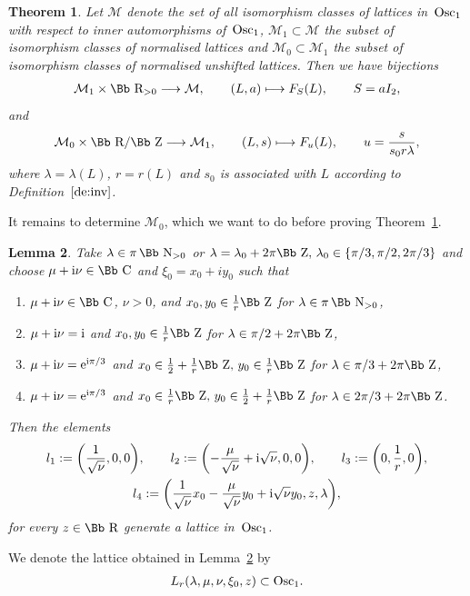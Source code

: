 \documentclass[10pt,a4paper]{amsart}
\newcommand\CC{{\mbox{\Bb C}}}
\newcommand\RR{{\mbox{\Bb R}}}
\newcommand\NN{{\mbox{\Bb N}}}
\newcommand\ZZ{{\mbox{\Bb Z}}}
\newcommand\cM{{\mathcal M}}
\newcommand{\Osc}{{\rm Osc}}
\newcommand{\benur}{\begin{enumerate}[label=$(\roman*)$]\itemsep=0pt}
\numberwithin{equation}{section}
\newtheorem{Theorem}{Theorem}[section]
\newtheorem{Lemma}[Theorem]{Lemma}
\begin{document}
\begin{Theorem} \label{MMM}
Let $\cM$ denote the set of all isomorphism classes of lattices in~$\Osc_1$ with respect to inner automorphisms of~$\Osc_1$, $\cM_1\subset \cM$ the subset of isomorphism classes of normalised lattices and $\cM_0\subset\cM_1$ the subset of isomorphism classes of normalised unshifted lattices. Then we have bijections
\begin{gather*}
\cM_1\times\RR_{>0} \longrightarrow \cM,\qquad (L,a)\longmapsto F_S(L),\qquad S=a I_2,
\end{gather*}
and
\begin{gather}\label{M0M1}
\cM_0 \times \RR/\ZZ \longrightarrow \cM_1,\qquad (L,s) \longmapsto F_u(L),\qquad u=\frac {s}{s_0r\lambda},
\end{gather}
where $\lambda=\lambda(L)$, $r=r(L)$ and $s_0$ is associated with $L$ according to Definition~$\ref{de:inv}$.
\end{Theorem}
It remains to determine $\cM_0$, which we want to do before proving Theorem~\ref{MMM}.
\begin{Lemma}\label{lmlattice} Take $\lambda\in \pi\, \NN_{>0}$ or $\lambda= \lambda_0+2\pi\ZZ,\, \lambda_0\in \{\pi/3, \pi/2, 2\pi/3\}$ and choose $\mu+{\rm i}\nu\in\CC$ and $\xi_0=x_0+iy_0$ such that
\benur
\item $\mu+{\rm i}\nu\in \CC$, $\nu>0$, and $x_0,y_0\in \frac1r \ZZ$ for $\lambda \in \pi\,\NN_{>0}$,
\item $\mu+{\rm i}\nu = {\rm i}$ and $x_0,y_0\in \frac1r \ZZ$ for $\lambda \in \pi/2+2\pi\ZZ$,
\item $\mu+{\rm i}\nu ={\rm e}^{{\rm i}\pi/3}$ and $x_0\in \frac12+\frac1r \ZZ,\, y_0\in \frac1r \ZZ$ for $\lambda \in \pi/3+2\pi\ZZ$,
\item $\mu+{\rm i}\nu ={\rm e}^{{\rm i}\pi/3}$ and $x_0\in \frac1r \ZZ,\, y_0\in\frac12+ \frac1r \ZZ$ for $\lambda \in 2\pi/3+2\pi\ZZ$.
\end{enumerate}
Then the elements
\begin{gather*}
 l_1:=\bigg(\frac{1}{\sqrt\nu},0,0\bigg),\qquad
 l_2:=\bigg({-}\frac{\mu}{\sqrt\nu}+{\rm i}\sqrt\nu,0,0\bigg),\qquad
 l_3:=\bigg(0,\frac{1}{r},0\bigg),
 \\
l_4:=\bigg(\frac{1}{\sqrt\nu}x_0-\frac{\mu}{\sqrt\nu}y_0+{\rm i}\sqrt\nu y_0,z,\lambda \bigg),
\end{gather*}
for every $z\in\RR$ generate a lattice in~$\Osc_1$.
\end{Lemma}
%
\begin{Definition}%
We denote the lattice obtained in Lemma~\ref{lmlattice} by
\begin{gather*}
L_r(\lambda,\mu,\nu,\xi_0,z)\subset \Osc_1.
\end{gather*}
\end{Definition}
\end{document}
